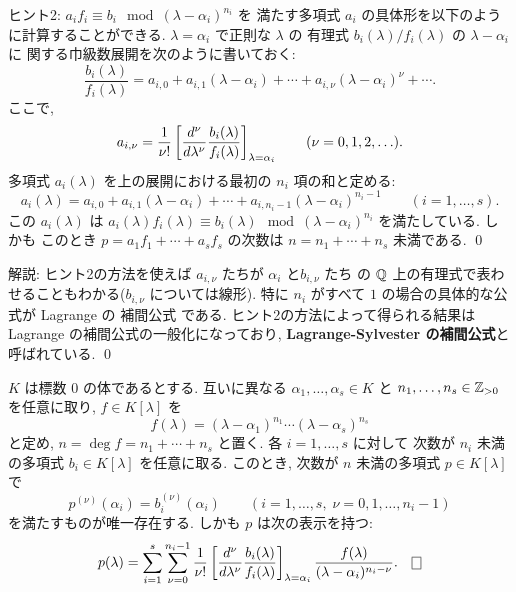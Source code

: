 \documentclass[12pt,twoside]{jarticle}
\begin{document}
\medskip
\noindent
ヒント2: $a_if_i\equiv b_i\mod{(\lambda-\alpha_i)^{n_i}}$ を
満たす多項式 $a_i$ の具体形を以下のように計算することができる.
$\lambda=\alpha_i$ で正則な $\lambda$ の
有理式 $b_i(\lambda)/f_i(\lambda)$ の $\lambda-\alpha_i$ に
関する巾級数展開を次のように書いておく:
\begin{equation*}
  \frac{b_i(\lambda)}{f_i(\lambda)} =
  a_{i,0}+a_{i,1}(\lambda-\alpha_i)+\cdots
  +a_{i,\nu}(\lambda-\alpha_i)^{\nu} + \cdots.
\end{equation*}
ここで, 
\begin{equation*}
  a_{i,\nu} = 
  \frac{1}{\nu !}
  \left[
    \frac{d ^\nu}{d \lambda^\nu}
    \frac{b_i(\lambda)}{f_i(\lambda)}
  \right]_{\lambda=\alpha_i}
  \qquad (\nu=0,1,2,\ldots).
\end{equation*}
多項式 $a_i(\lambda)$ を上の展開における最初の $n_i$ 項の和と定める:
\begin{equation*}
  a_i(\lambda) = 
  a_{i,0}+a_{i,1}(\lambda-\alpha_i)+\cdots
  +a_{i,n_i-1}(\lambda-\alpha_i)^{n_i-1}
  \qquad (i=1,\dots,s).
\end{equation*}
この $a_i(\lambda)$ は $
a_i(\lambda)f_i(\lambda) \equiv b_i(\lambda)
\mod (\lambda-\alpha_i)^{n_i}
$ を満たしている. しかも
このとき $p=a_1f_1+\cdots+a_sf_s$ の次数は $n=n_1+\cdots+n_s$ 未満である.
\qed

\medskip
\noindent
解説: ヒント2の方法を使えば $a_{i,\nu}$ たちが $\alpha_i$ と$b_{i,\nu}$ たち
の ${\mathbb Q}$ 上の有理式で表わせることもわかる($b_{i,\nu}$ については線形).  
特に $n_i$ がすべて $1$ の場合の具体的な公式が Lagrange の
補間公式  である.  
ヒント2の方法によって得られる結果は Lagrange の補間公式の一般化になっており,
{\bf Lagrange-Sylvester の補間公式}と呼ばれている. 
\qed

\begin{theorem}
\label{theorem:Lagrange-Sylvester}
  $K$ は標数 $0$ の体であるとする.
  互いに異なる $\alpha_1,\dots,\alpha_s\in K$ 
  と $n_1,\dots,n_s\in{\mathbb Z}_{>0}$ を任意に取り, $f\in K[\lambda]$ を
  \begin{equation*}
    f(\lambda) = (\lambda-\alpha_1)^{n_1}\cdots(\lambda-\alpha_s)^{n_s}
  \end{equation*}
  と定め, $n=\deg f =n_1+\cdots+n_s$ と置く.
  各 $i=1,\dots,s$ に対して
  次数が $n_i$ 未満の多項式 $b_i\in K[\lambda]$ を任意に取る.
  このとき, 次数が $n$ 未満の多項式 $p\in K[\lambda]$ で
  \begin{equation*}
    p^{(\nu)}(\alpha_i) = b_i^{(\nu)}(\alpha_i)
    \qquad (i=1,\dots,s,\; \nu=0,1,\dots,n_i-1)
  \end{equation*}
  を満たすものが唯一存在する. しかも $p$ は次の表示を持つ:
  \begin{equation*}
    p(\lambda) = 
    \sum_{i=1}^s 
    \sum_{\nu=0}^{n_i-1}
    \frac{1}{\nu !}
    \left[
      \odfrac{^\nu}{\lambda^\nu}
      \frac{b_i(\lambda)}{f_i(\lambda)}
    \right]_{\lambda=\alpha_i}
    \frac{f(\lambda)}{(\lambda-\alpha_i)^{n_i-\nu}}.
    \qed
  \end{equation*}
\end{theorem}
\end{document}
